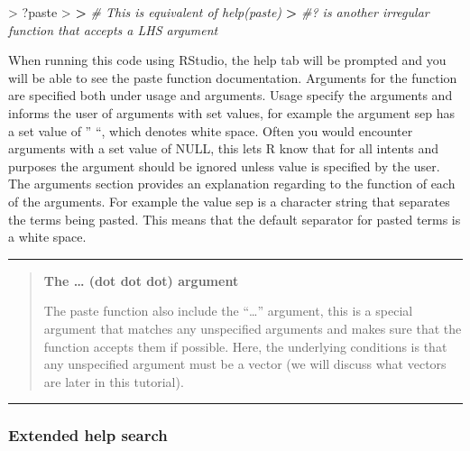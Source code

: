 \documentclass[
]{book}
\newenvironment{Shaded}{\begin{snugshade}}{\end{snugshade}}
\newcommand{\CommentTok}[1]{\textcolor[rgb]{0.56,0.35,0.01}{\textit{#1}}}
\newcommand{\ErrorTok}[1]{\textcolor[rgb]{0.64,0.00,0.00}{\textbf{#1}}}
\newcommand{\NormalTok}[1]{#1}
\newcommand{\SpecialCharTok}[1]{\textcolor[rgb]{0.00,0.00,0.00}{#1}}
\theoremstyle{definition}
\theoremstyle{definition}
\theoremstyle{definition}
\theoremstyle{definition}
\theoremstyle{remark}
\begin{document}
\begin{Shaded}
\begin{Highlighting}[]
\SpecialCharTok{\textgreater{}}\NormalTok{ ?paste}
\SpecialCharTok{\textgreater{}} 
\ErrorTok{\textgreater{}} \CommentTok{\# This is equivalent of help(paste)}
\ErrorTok{\textgreater{}} \CommentTok{\#? is another irregular function that accepts a LHS argument}
\end{Highlighting}
\end{Shaded}

When running this code using RStudio, the help tab will be prompted and you will be able to see the paste function
documentation. Arguments for the function are specified both under usage and arguments.
Usage specify the arguments and informs the user of arguments with set values, for example the argument sep has a set
value of '' ``, which denotes white space. Often you would encounter arguments with a set value of NULL, this lets R
know that for all intents and purposes the argument should be ignored unless value is specified by the user.\\
The arguments section provides an explanation regarding to the function of each of the arguments. For example the
value sep is a character string that separates the terms being pasted. This means that the default separator for
pasted terms is a white space.

\begin{center}\rule{0.5\linewidth}{0.5pt}\end{center}

\begin{quote}
\textbf{The \ldots{} (dot dot dot) argument}

The paste function also include the ``\ldots{}'' argument, this is a special argument that matches any unspecified
arguments and makes sure that the function accepts them if possible. Here, the underlying conditions is that any
unspecified argument must be a vector (we will discuss what vectors are later in this tutorial).
\end{quote}

\begin{center}\rule{0.5\linewidth}{0.5pt}\end{center}

\hypertarget{extended-help-search}{%
\subsubsection*{\texorpdfstring{\textbf{Extended help search}}{Extended help search}}\label{extended-help-search}}
\end{document}

